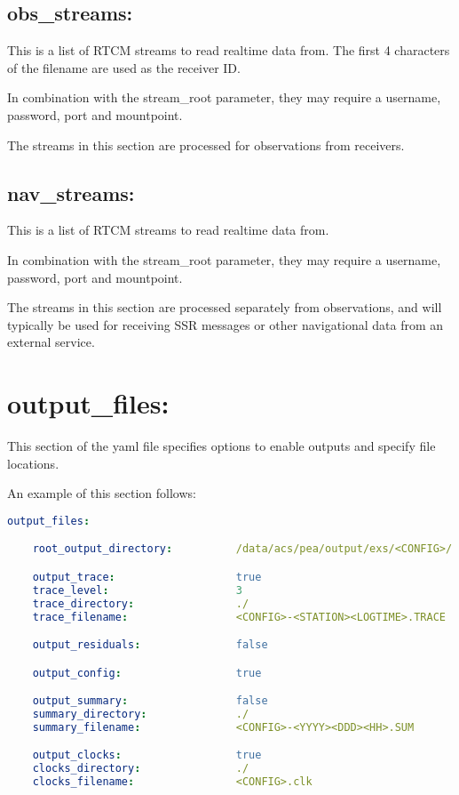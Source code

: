 \subsection{obs\_streams:}
This is a list of RTCM streams to read realtime data from. The first 4 characters of the filename are used as the receiver ID.

In combination with the stream\_root parameter, they may require a username, password, port and mountpoint.

The streams in this section are processed for observations from receivers.

\subsection{nav\_streams:}
This is a list of RTCM streams to read realtime data from. 

In combination with the stream\_root parameter, they may require a username, password, port and mountpoint.

The streams in this section are processed separately from observations, and will typically be used for receiving SSR messages or other navigational data from an external service.

\section{output\_files:}
This section of the yaml file specifies options to enable outputs and specify file locations.

An example of this section follows:
\begin{lstlisting}[language=yaml,caption=output\_files:]
output_files:

    root_output_directory:          /data/acs/pea/output/exs/<CONFIG>/

    output_trace:                   true
    trace_level:                    3
    trace_directory:                ./
    trace_filename:                 <CONFIG>-<STATION><LOGTIME>.TRACE

    output_residuals:               false

    output_config:                  true

    output_summary:                 false
    summary_directory:              ./
    summary_filename:               <CONFIG>-<YYYY><DDD><HH>.SUM

    output_clocks:                  true
    clocks_directory:               ./
    clocks_filename:                <CONFIG>.clk
\end{lstlisting}

